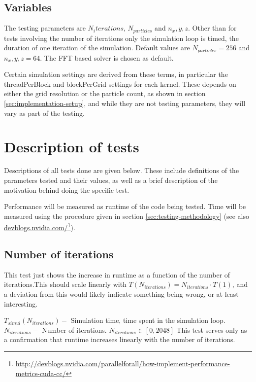\subsection{Variables}
The testing parameters are $N_iterations$, $N_{particles}$ and $n_x,y,z$. Other than for tests involving the number of
iterations only the simulation loop is timed, the duration of one iteration of the simulation. Default values are $N_{particles} = 256$
and $n_x,y,z = 64$. The FFT based solver is chosen as default.

Certain simulation settings are derived from these terms, in particular the threadPerBlock and blockPerGrid settings for
each kernel. These depends on either the grid resolution or the particle count, as shown in section \ref{sec:implementation-setup}, and
while they are not testing parameters, they will vary as part of the testing.

\section{Description of tests}
Descriptions of all tests done are given below. These include definitions of the parameters tested and their values, as
well as a brief description of the motivation behind doing the specific test.

Performance will be measured as runtime of the code being tested. Time will be measured using the procedure given in
section \ref{sec:testing-methodology} (see also \href{http://devblogs.nvidia.com/parallelforall/how-implement-performance-metrics-cuda-cc/}{devblogs.nvidia.com/}\footnote{\url{http://devblogs.nvidia.com/parallelforall/how-implement-performance-metrics-cuda-cc/}}).

\subsection{Number of iterations}
This test just shows the increase in runtime as a function of the number of iterations.This should scale linearly with
$T(N_{iterations}) = N_{iterations}\cdot T(1)$, and a deviation from this would likely indicate something being wrong, or
at least interesting.

	{$T_{simul}(N_{iterations}) -$ Simulation time, time spent in the simulation loop.}
	{$N_{iterations} -$ Number of iterations.}
	{$N_{iterations} \in [0, 2048]$}
	{This test serves only as a confirmation that runtime increases linearly with the number of iterations.}

